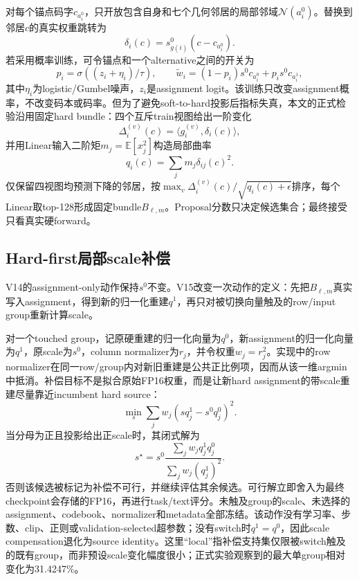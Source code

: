 对每个锚点码字$c_{a_i^0}$，只开放包含自身和七个几何邻居的局部邻域$\mathcal N(a_i^0)$。替换到邻居$c$的真实权重跳转为
\begin{equation}
\delta_i(c)=s_{g(i)}^0(c-c_{a_i^0}).
\end{equation}
若采用概率训练，可令锚点和一个alternative之间的开关为
\begin{equation}
p_i=\sigma((z_i+\eta_i)/\tau),\qquad
\widetilde w_i=(1-p_i)s^0c_{a_i^0}+p_i s^0c_{a_i^1},
\end{equation}
其中$\eta_i$为logistic/Gumbel噪声，$z_i$是assignment logit。该训练只改变assignment概率，不改变码本或码率。但为了避免soft-to-hard投影后指标失真，本文的正式检验沿用固定hard bundle：四个互斥train视图给出一阶变化
\begin{equation}
\Delta_i^{(v)}(c)=\langle g_i^{(v)},\delta_i(c)\rangle,
\end{equation}
并用Linear输入二阶矩$m_j=\mathbb E[x_j^2]$构造局部曲率
\begin{equation}
q_i(c)=\sum_j m_j\delta_{ij}(c)^2.
\end{equation}
仅保留四视图均预测下降的邻居，按$\max_v\Delta_i^{(v)}(c)/\sqrt{q_i(c)+\epsilon}$排序，每个Linear取top-128形成固定bundle$B_{\ell,m}$。Proposal分数只决定候选集合；最终接受只看真实硬forward。

\subsection{Hard-first局部scale补偿}

V14的assignment-only动作保持$s^0$不变。V15改变一次动作的定义：先把$B_{\ell,m}$真实写入assignment，得到新的归一化重建$q^1$，再只对被切换向量触及的row/input group重新计算scale。

对一个touched group，记原硬重建的归一化向量为$q^0$，新assignment的归一化向量为$q^1$，原scale为$s^0$，column normalizer为$r_j$，并令权重$w_j=r_j^2$。实现中的row normalizer在同一row/group内对新旧重建是公共正比例项，因而从该一维argmin中抵消。补偿目标不是拟合原始FP16权重，而是让新hard assignment的带scale重建尽量靠近incumbent hard source：
\begin{equation}
\min_s \sum_j w_j(s q^1_j-s^0 q^0_j)^2.
\end{equation}
当分母为正且投影给出正scale时，其闭式解为
\begin{equation}
s^\star=s^0\frac{\sum_j w_jq_j^1q_j^0}{\sum_jw_j(q_j^1)^2}.
\end{equation}
否则该候选被标记为补偿不可行，并继续评估其余候选。可行解立即舍入为最终checkpoint会存储的FP16，再进行task/text评分。未触及group的scale、未选择的assignment、codebook、normalizer和metadata全部冻结。该动作没有学习率、步数、clip、正则或validation-selected超参数；没有switch时$q^1=q^0$，因此scale compensation退化为source identity。这里``local''指补偿支持集仅限被switch触及的既有group，而非预设scale变化幅度很小；正式实验观察到的最大单group相对变化为31.4247\%。

